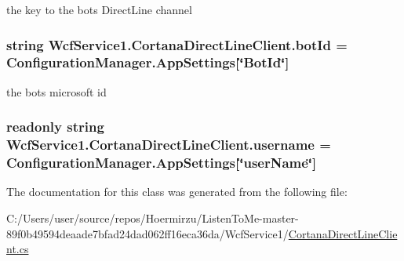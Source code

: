 the key to the bot\textquotesingle{}s Direct\+Line channel 

\subsubsection[{\texorpdfstring{bot\+Id}{botId}}]{\setlength{\rightskip}{0pt plus 5cm}string Wcf\+Service1.\+Cortana\+Direct\+Line\+Client.\+bot\+Id = Configuration\+Manager.\+App\+Settings\mbox{[}\char`\"{}Bot\+Id\char`\"{}\mbox{]}\hspace{0.3cm}{\ttfamily [private]}}\hypertarget{class_wcf_service1_1_1_cortana_direct_line_client_a92b26da0f83e644653c3cd4f8c248b1b}{}\label{class_wcf_service1_1_1_cortana_direct_line_client_a92b26da0f83e644653c3cd4f8c248b1b}


the bot\textquotesingle{}s microsoft id 

\subsubsection[{\texorpdfstring{username}{username}}]{\setlength{\rightskip}{0pt plus 5cm}readonly string Wcf\+Service1.\+Cortana\+Direct\+Line\+Client.\+username = Configuration\+Manager.\+App\+Settings\mbox{[}\char`\"{}user\+Name\char`\"{}\mbox{]}\hspace{0.3cm}{\ttfamily [private]}}\hypertarget{class_wcf_service1_1_1_cortana_direct_line_client_a5c02c54f3f2ed0d5c508092e516cb5d9}{}\label{class_wcf_service1_1_1_cortana_direct_line_client_a5c02c54f3f2ed0d5c508092e516cb5d9}


The documentation for this class was generated from the following file\+:\begin{DoxyCompactItemize}
\item 
C\+:/\+Users/user/source/repos/\+Hoermirzu/\+Listen\+To\+Me-\/master-\/89f0b49594deaade7bfad24dad062ff16eca36da/\+Wcf\+Service1/\hyperlink{_cortana_direct_line_client_8cs}{Cortana\+Direct\+Line\+Client.\+cs}\end{DoxyCompactItemize}

